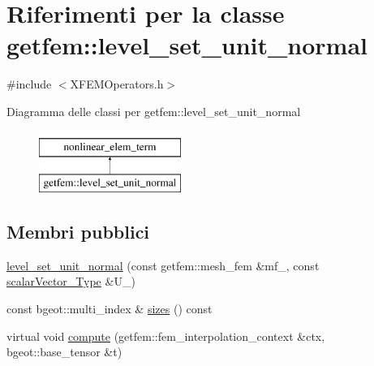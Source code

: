 \hypertarget{classgetfem_1_1level__set__unit__normal}{\section{Riferimenti per la classe getfem\-:\-:level\-\_\-set\-\_\-unit\-\_\-normal}
\label{classgetfem_1_1level__set__unit__normal}
}


{\ttfamily \#include $<$X\-F\-E\-M\-Operators.\-h$>$}

Diagramma delle classi per getfem\-:\-:level\-\_\-set\-\_\-unit\-\_\-normal\begin{figure}[H]
\begin{center}
\leavevmode
\includegraphics[height=2.000000cm]{classgetfem_1_1level__set__unit__normal}
\end{center}
\end{figure}
\subsection*{Membri pubblici}
\begin{DoxyCompactItemize}
\item 
\hyperlink{classgetfem_1_1level__set__unit__normal_ab3614c6046c7f4875bf7f295dc858463}{level\-\_\-set\-\_\-unit\-\_\-normal} (const getfem\-::mesh\-\_\-fem \&mf\-\_\-, const \hyperlink{Core_8h_a4e75b5863535ba1dd79942de2846eff0}{scalar\-Vector\-\_\-\-Type} \&U\-\_\-)
\item 
const bgeot\-::multi\-\_\-index \& \hyperlink{classgetfem_1_1level__set__unit__normal_a752cfcceeb76e736146a75ee676366a1}{sizes} () const 
\item 
virtual void \hyperlink{classgetfem_1_1level__set__unit__normal_ad1c18b6cbd9bad011fc00198d06b62f8}{compute} (getfem\-::fem\-\_\-interpolation\-\_\-context \&ctx, bgeot\-::base\-\_\-tensor \&t)
\end{DoxyCompactItemize}


